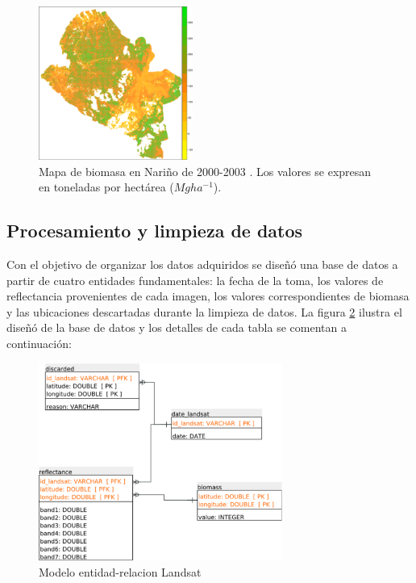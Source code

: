 \begin{figure}
  \centering
  \includegraphics[width = 0.45\textwidth]{mapaNarino.png}
  \caption{Mapa de biomasa en Nariño de 2000-2003 \cite{baccini2008afirst}. Los valores se expresan en toneladas por hectárea ($Mg ha^{−1}$).}
  \label{fig:mapaNarino}
\end{figure}

\subsection{Procesamiento y limpieza de datos}

Con el objetivo de organizar los datos adquiridos se diseñó una base de datos a partir de cuatro entidades fundamentales: la fecha de la toma, los valores de reflectancia provenientes de cada imagen, los valores correspondientes de biomasa y las ubicaciones descartadas durante la limpieza de datos.  La figura \ref{fig:landsatET} ilustra el diseñó de la base de datos y los detalles de cada tabla se comentan a continuación:

\begin{figure}
  \centering
  \includegraphics[width = 8cm]{landsatET.pdf}
  \caption{Modelo entidad-relacion Landsat}
  \label{fig:landsatET}
\end{figure}

